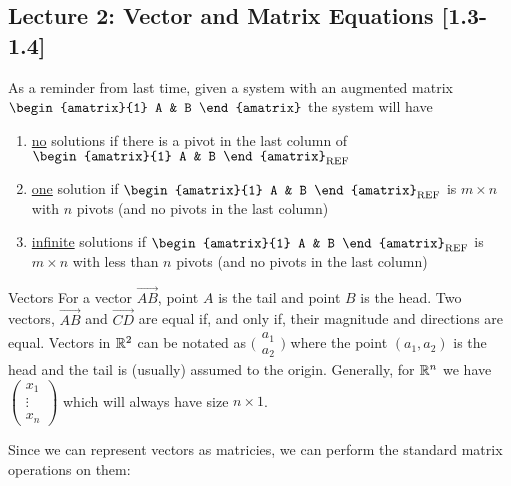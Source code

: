 \subsection{Lecture 2: Vector and Matrix Equations [1.3-1.4]}

As a reminder from last time, given a system with an augmented matrix 
$\begin{amatrix}{1}
    A & B
\end{amatrix}$
the system will have
\begin{enumerate}
    \item \underline{no} solutions if there is a pivot in the last column of 
    $\begin{amatrix}{1}
        A & B
    \end{amatrix}_{\text{REF}}$
    \item \underline{one} solution if $\begin{amatrix}{1}
        A & B
    \end{amatrix}_{\text{REF}}$ is $m \times n$ with $n$ pivots (and no pivots in the last column)
    \item \underline{infinite} solutions if $\begin{amatrix}{1}
        A & B
    \end{amatrix}_{\text{REF}}$ is $m \times n$ with less than $n$ pivots (and no pivots in the last column)
\end{enumerate}

\begin{defbox}{Vectors}{}
    For a vector $\vec{AB}$, point $A$ is the tail and point $B$ is the head. Two vectors, $\vec{AB}$ and $\vec{CD}$ are equal if, and only if, their magnitude and directions are equal. Vectors in $\mathbb R^{2}$ can be notated as $\big(\begin{smallmatrix} a_1 \\ a_ 2\end{smallmatrix}\big)$ where the point $(a_1, a_2)$ is the head and the tail is (usually) assumed to the origin. Generally, for $\mathbb R^{n}$ we have $\begin{pmatrix} x_1 \\ \vdots \\ x_n \end{pmatrix}$ which will always have size $n \times 1$.
\end{defbox}

Since we can represent vectors as matricies, we can perform the standard matrix operations on them:

